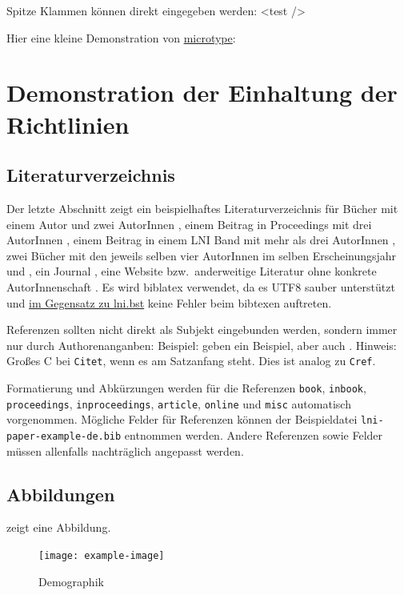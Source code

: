 \documentclass[utf8,biblatex]{lni}
\begin{document}
Spitze Klammen können direkt eingegeben werden: <test />

Hier eine kleine Demonstration von \href{https://www.ctan.org/pkg/microtype}{microtype}:
\blindtext

\section{Demonstration der Einhaltung der Richtlinien}
\label{sec:lniconformance}

\subsection{Literaturverzeichnis}
Der letzte Abschnitt zeigt ein beispielhaftes Literaturverzeichnis für Bücher mit einem Autor \cite{Ez10} und zwei AutorInnen \cite{AB00}, einem Beitrag in Proceedings mit drei AutorInnen \cite{ABC01}, einem Beitrag in einem LNI Band mit mehr als drei AutorInnen \cite{Az09}, zwei Bücher mit den jeweils selben vier AutorInnen im selben Erscheinungsjahr \cite{Wa14} und \cite{Wa14b}, ein Journal \cite{Gl06}, eine Website \cite{GI14} bzw.\ anderweitige Literatur ohne konkrete AutorInnenschaft \cite{XX14}.
Es wird biblatex verwendet, da es UTF8 sauber unterstützt und \href{https://github.com/gi-ev/LNI/issues/5}{im Gegensatz zu lni.bst} keine Fehler beim bibtexen auftreten.

Referenzen sollten nicht direkt als Subjekt eingebunden werden, sondern immer nur durch Authorenanganben:
Beispiel:  geben ein Beispiel, aber auch \citet{Az09}.
Hinweis: Großes C bei \texttt{Citet}, wenn es am Satzanfang steht. Dies ist analog zu \texttt{Cref}.

Formatierung und Abkürzungen werden für die Referenzen \texttt{book}, \texttt{inbook}, \texttt{proceedings}, \texttt{inproceedings}, \texttt{article}, \texttt{online} und \texttt{misc} automatisch vorgenommen.
Mögliche Felder für Referenzen können der Beispieldatei \texttt{lni-paper-example-de.bib} entnommen werden.
Andere Referenzen sowie Felder müssen allenfalls nachträglich angepasst werden.

\subsection{Abbildungen}
 zeigt eine Abbildung.

\begin{figure}
  \centering
  \texttt{[image: example-image]}
  \caption{Demographik}
  \label{fig:demo}
\end{figure}
\end{document}
